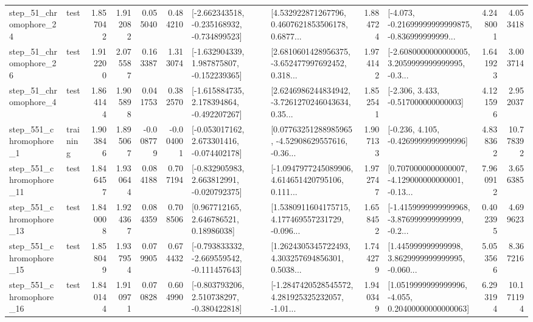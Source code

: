 \begin{tabular}{llrrrrllrlrr}
   step\_51\_chromophore\_24 &      test &      1.857042 &    1.912082 &      0.055040 &  0.484210 &  [-2.662343518, -0.235168932, -0.734899523] &  [4.532922871267796, 0.4607621853506178, 0.6877... &       1.884724 &  [-4.073, -0.21699999999999875, -0.836999999999... &            4.248001 &          4.053418 \\
   step\_51\_chromophore\_26 &      test &      1.912200 &    2.075587 &      0.163387 &  1.313074 &   [-1.632904339, 1.987875807, -0.152239365] &  [2.6810601428956375, -3.652477997692452, 0.318... &       1.974142 &  [-2.6080000000000005, 3.2059999999999995, -0.3... &            1.641923 &          3.003714 \\
    step\_51\_chromophore\_4 &      test &      1.864144 &    1.905898 &      0.041753 &  0.382570 &   [-1.615884735, 2.178394864, -0.492207267] &  [2.6246986244834942, -3.7261270246043634, 0.35... &       1.852541 &                [-2.306, 3.433, -0.517000000000003] &            4.121596 &          2.952037 \\
   step\_551\_chromophore\_1 &  training &      1.903846 &    1.895067 &     -0.008779 & -0.004001 &   [-0.053017162, 2.673301416, -0.074402178] &  [0.07763251288985965, -4.52908629557616, -0.36... &       1.907133 &               [-0.236, 4.105, -0.4269999999999996] &            4.838362 &         10.778392 \\
  step\_551\_chromophore\_11 &      test &      1.846457 &    1.930644 &      0.084188 &  0.707194 &   [-0.832905983, 2.663812991, -0.020792375] &  [-1.0947977245089906, 4.614651420795106, 0.111... &       1.972747 &  [0.7070000000000007, -4.129000000000001, -0.13... &            7.960912 &          3.656385 \\
  step\_551\_chromophore\_13 &      test &      1.840008 &    1.924367 &      0.084359 &  0.708506 &      [0.967712165, 2.646786521, 0.18986038] &  [1.5380911604175715, 4.177469557231729, -0.096... &       1.658452 &  [-1.4159999999999968, -3.876999999999999, -0.2... &            0.402395 &          4.699623 \\
  step\_551\_chromophore\_15 &      test &      1.858049 &    1.937954 &      0.079905 &  0.674432 &  [-0.793833332, -2.669559542, -0.111457643] &  [1.2624305345722493, 4.303257694856301, 0.5038... &       1.744279 &  [1.445999999999998, 3.8629999999999995, -0.060... &            5.053566 &          8.367216 \\
  step\_551\_chromophore\_16 &      test &      1.840144 &    1.910971 &      0.070828 &  0.604990 &   [-0.803793206, 2.510738297, -0.380422818] &  [-1.2847420528545572, 4.281925325232057, -1.01... &       1.940349 &  [1.0519999999999996, -4.055, 0.20400000000000063] &            6.293194 &         10.171194 \\

\end{tabular}
